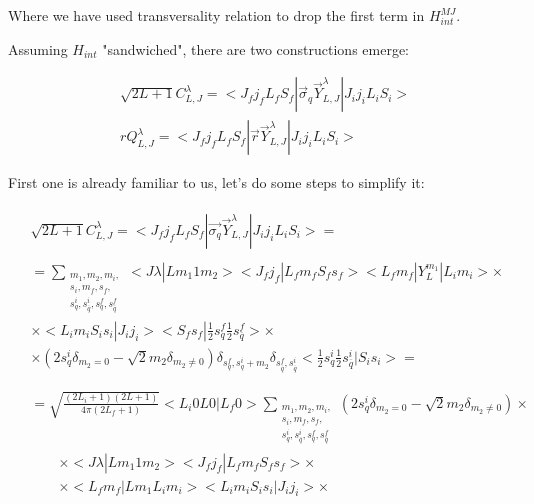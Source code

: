 Where we have used transversality relation to drop the first term in $H_{int}^{MJ}$.

Assuming $H_{int}$ "sandwiched", there are two constructions emerge:

\begin{align}
    &\sqrt{2L+1} C_{L, J}^\lambda = <J_f j_f L_f S_f|\vec{\sigma}_{q} \vec{Y}^{\lambda}_{L, J}|J_i j_i L_i S_i> \\
    &r Q_{L, J}^\lambda = <J_f j_f L_f S_f|\vec{r} \vec{Y}^{\lambda}_{L, J}|J_i j_i L_i S_i>
\end{align}

First one is already familiar to us, let's do some steps to simplify it:

\begin{align} \label{app:hint-mult:Ccoef-reduce}
    \begin{split}
        &\sqrt{2L+1} C_{L, J}^\lambda = <J_f j_f L_f S_f| \vec{\sigma_q} \vec{Y}_{L, J}^\lambda |J_i j_i L_i S_i> =
    \end{split} \\
    \begin{split}
        &= \sum_{\substack{m_1, m_2, m_i,\\ s_i, m_f, s_f,\\ s^i_{q}, s^{i}_{\overline{q}}, s^{f}_{q}, s^{f}_{\overline{q}}}} <J \lambda| L m_1 1 m_2> <J_f j_f| L_f m_f S_f s_f> <L_f m_f| Y_{L}^{m_1} |L_i m_i> \times \\
        &\times <L_i m_i S_i s_i| J_i j_i> <S_f s_f| \frac{1}{2} s^f_{q} \frac{1}{2} s^f_{\overline{q}}> \times \\
        &\times (2 s_q^i \delta_{m_2 = 0} - \sqrt{2} m_2 \delta_{m_2 \neq 0}) \delta_{s^f_{q}, s^{i}_{q} + m_2} \delta_{s^f_{\overline{q}}, s^i_{\overline{q}}} <\frac{1}{2} s^i_{q} \frac{1}{2} s^i_{\overline{q}} |S_i s_i> = \\
    \end{split} \\
    \begin{split}
        &= \sqrt{\frac{(2L_i + 1)(2L+1)}{4 \pi (2L_f + 1)}} <L_i 0 L 0 | L_f 0> \sum_{\substack{m_1, m_2, m_i,\\ s_i, m_f, s_f,\\ s^i_{q}, s^{i}_{\overline{q}}, s^{f}_{q}, s^{f}_{\overline{q}}}} (2 s_q^i \delta_{m_2 = 0} - \sqrt{2} m_2 \delta_{m_2 \neq 0}) \times \\
        &\qquad\times <J \lambda| L m_1 1 m_2> <J_f j_f| L_f m_f S_f s_f> \times \\
        &\qquad\times <L_f m_f| L m_1 L_i m_i>  <L_i m_i S_i s_i| J_i j_i> \times\\

\end{split}
\end{align}
